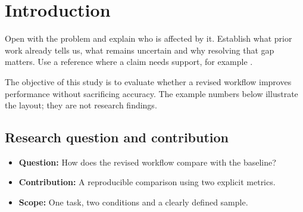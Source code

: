 \section{Introduction}
Open with the problem and explain who is affected by it. Establish what prior
work already tells us, what remains uncertain and why resolving that gap matters.
Use a reference where a claim needs support, for example \cite{example}.

The objective of this study is to evaluate whether a revised workflow improves
performance without sacrificing accuracy. The example numbers below illustrate
the layout; they are not research findings.
\subsection{Research question and contribution}
\begin{itemize}
\item \textbf{Question:} How does the revised workflow compare with the baseline?
\item \textbf{Contribution:} A reproducible comparison using two explicit metrics.
\item \textbf{Scope:} One task, two conditions and a clearly defined sample.
\end{itemize}

